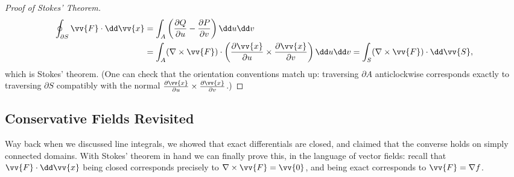 \begin{proof}[Proof of Stokes' Theorem]
	\begin{align*}
		\oint_{\partial S} \vv{F} \cdot \dd \vv{x} &= \int_A \left(\frac{\partial Q}{\partial u} - \frac{\partial P}{\partial v}\right) \dd u \dd v \\
		&= \int_A (\nabla \times \vv{F}) \cdot \left(\frac{\partial \vv{x}}{\partial u} \times \frac{\partial \vv{x}}{\partial v}\right) \dd u \dd v = \int_S (\nabla \times \vv{F}) \cdot \dd \vv{S},
	\end{align*}
	which is Stokes' theorem. (One can check that the orientation conventions match up: traversing $\partial A$ anticlockwise corresponds exactly to traversing $\partial S$ compatibly with the normal $\frac{\partial \vv{x}}{\partial u} \times \frac{\partial \vv{x}}{\partial v}$.)
\end{proof}

\subsection{Conservative Fields Revisited}

Way back when we discussed line integrals, we showed that exact differentials are closed, and claimed that the converse holds on simply connected domains. With Stokes' theorem in hand we can finally prove this, in the language of vector fields: recall that $\vv{F} \cdot \dd \vv{x}$ being closed corresponds precisely to $\nabla \times \vv{F} = \vv{0}$, and being exact corresponds to $\vv{F} = \nabla f$.

